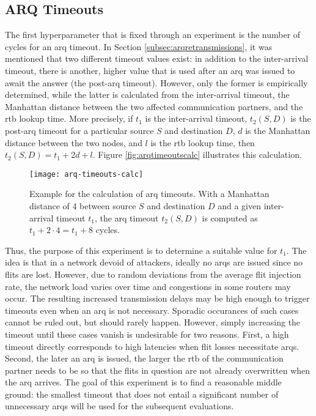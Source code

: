 \subsection{ARQ Timeouts}\label{subsec:arqtimeouts}
The first hyperparameter that is fixed through an experiment is the number of cycles for an \gls{arq} timeout. In Section
\ref{subsec:arqretransmissions}, it was mentioned that two different timeout values exist: in addition to the inter-arrival timeout, there is another,
higher value that is used after an \gls{arq} was issued to await the answer (the post-\gls{arq} timeout). However, only the former
is empirically determined, while the latter is calculated from the inter-arrival timeout, the Manhattan distance between the
two affected communication partners, and the \gls{rtb} lookup time. More precisely, if $t_1$ is the inter-arrival timeout, $t_2(S, D)$ is the post-\gls{arq} timeout for a
particular source $S$ and destination $D$, $d$ is the Manhattan distance between the two nodes, and $l$ is the \gls{rtb} lookup time, then $t_2(S, D)
= t_1 + 2d + l$. Figure \vref{fig:arqtimeoutscalc} illustrates this calculation. 

\begin{figure}
    \centering
    \texttt{[image: arq-timeouts-calc]}
    \caption[Example of ARQ timeout calculation]{Example for the calculation of \gls{arq} timeouts. With a Manhattan distance of 4 between source $S$ and
    destination $D$ and a given inter-arrival timeout $t_1$, the \gls{arq} timeout $t_2(S, D)$ is computed as $t_1 + 2 \cdot 4 = t_1 + 8$ cycles.}
    \label{fig:arqtimeoutscalc}
\end{figure}

Thus, the purpose of this experiment is to determine a suitable value for $t_1$. The idea is that in a network devoid of attackers, ideally no
\glspl{arq} are issued since no flits are lost. However, due to random deviations from the average flit injection rate, the network load varies over
time and congestions in some routers
may occur. The resulting increased transmission delays may be high enough to trigger timeouts even when an \gls{arq} is not necessary. Sporadic
occurances of such cases cannot be ruled out, but should rarely happen. However, simply increasing the timeout until these cases vanish is undesirable
for two reasons. First, a high timeout directly corresponds to high latencies when flit losses necessitate \glspl{arq}. Second, the later an \gls{arq}
is issued, the larger the \gls{rtb} of the communication partner needs to be so that the flits in question are not already overwritten when the
\gls{arq} arrives. The goal of this experiment is to find a reasonable middle ground: the smallest timeout that does not entail a significant number of
unnecessary \glspl{arq} will be used for the subsequent evaluations.

